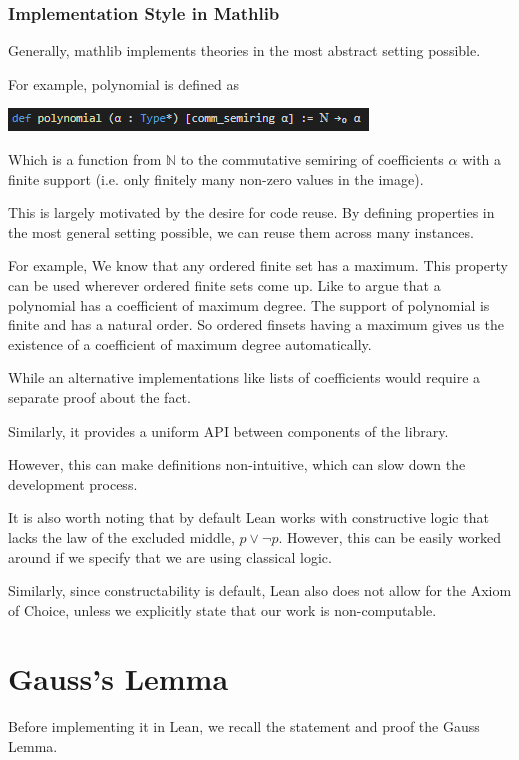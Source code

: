 \documentclass[pagesize=a4]{scrreprt}
\newcommand{\N}{\mathbb{N}}
\begin{document}
\subsubsection{Implementation Style in Mathlib}

Generally, mathlib implements theories in the most abstract setting possible. 

For example, polynomial is defined as

\includegraphics{polynomial.png}

Which is a function from $\N$ to the commutative semiring of coefficients $\alpha$ with a finite support (i.e. only finitely many non-zero values in the image). 

  This is largely motivated by the desire for code reuse. By defining properties in the most general setting possible, we can reuse them across many instances.

 For example, We know that any ordered finite set has a maximum. This property can be used wherever ordered finite sets come up. 
        Like to argue that a polynomial has a coefficient of maximum degree. The support of polynomial is finite and has a natural order. So ordered finsets having a maximum gives us the existence of a coefficient of maximum degree automatically.


 While an alternative implementations like lists of coefficients would require a separate proof about the fact. 


 Similarly, it provides a uniform API between components of the library. 

 However, this can make definitions non-intuitive, which can slow down the development process. 

 It is also worth noting that by default Lean works with constructive logic that lacks the law of the excluded middle, $p \vee \neg p$. However, this can be easily worked around if we specify that we are using classical logic. 

Similarly, since constructability is default, Lean also does not allow for the Axiom of Choice, unless we explicitly state that our work is non-computable. 


\section{Gauss's Lemma}

Before implementing it in Lean, we recall the statement and proof the Gauss Lemma. 
\end{document}
